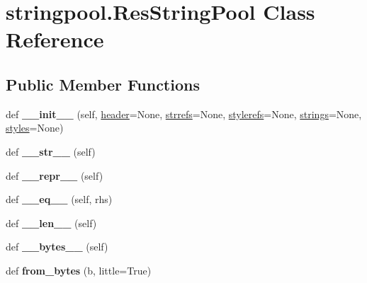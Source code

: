 \hypertarget{classstringpool_1_1ResStringPool}{}\section{stringpool.\+Res\+String\+Pool Class Reference}
\label{classstringpool_1_1ResStringPool}
\subsection*{Public Member Functions}
\begin{DoxyCompactItemize}
\item 
\mbox{\label{classstringpool_1_1ResStringPool_a3eca287e397624e4ac0a02e8466ba759}} 
def {\bfseries \+\_\+\+\_\+init\+\_\+\+\_\+} (self, \mbox{\hyperlink{classstringpool_1_1ResStringPool_a4c316a2e48a2e2d63757a9878a1c904c}{header}}=None, \mbox{\hyperlink{classstringpool_1_1ResStringPool_a7cd43d8421ba9f2060ad5555637245c6}{strrefs}}=None, \mbox{\hyperlink{classstringpool_1_1ResStringPool_a28ab464baab495dadcface0abb9b9839}{stylerefs}}=None, \mbox{\hyperlink{classstringpool_1_1ResStringPool_a2a5d467e9ad5d414ea401190a81becc8}{strings}}=None, \mbox{\hyperlink{classstringpool_1_1ResStringPool_aebb7e52f22773bb87fc71dc79be2fb2f}{styles}}=None)
\item 
\mbox{\label{classstringpool_1_1ResStringPool_a1177b25685d37c7c0907f2efafc84b13}} 
def {\bfseries \+\_\+\+\_\+str\+\_\+\+\_\+} (self)
\item 
\mbox{\label{classstringpool_1_1ResStringPool_a37babd8b5902a3c4745f5568c0437ccc}} 
def {\bfseries \+\_\+\+\_\+repr\+\_\+\+\_\+} (self)
\item 
\mbox{\label{classstringpool_1_1ResStringPool_a4479beee650e26cdbbb7d81846bf0d89}} 
def {\bfseries \+\_\+\+\_\+eq\+\_\+\+\_\+} (self, rhs)
\item 
\mbox{\label{classstringpool_1_1ResStringPool_a750914e1242156f5cfe4bb59a2198428}} 
def {\bfseries \+\_\+\+\_\+len\+\_\+\+\_\+} (self)
\item 
\mbox{\label{classstringpool_1_1ResStringPool_a5bc2fff72f862a5879e3739c6c24ac63}} 
def {\bfseries \+\_\+\+\_\+bytes\+\_\+\+\_\+} (self)
\item 
\mbox{\label{classstringpool_1_1ResStringPool_a1ff4eebc900f8781f666d67dfe0f7255}} 
def {\bfseries from\+\_\+bytes} (b, little=True)
\end{DoxyCompactItemize}
